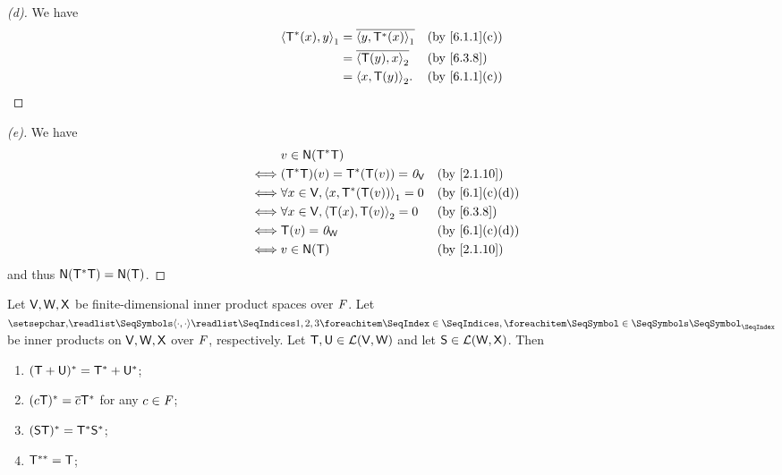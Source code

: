 \begin{proof}[(d)]
  We have
  \begin{align*}
    \inn{\T^*(x), y}_1 & = \conj{\inn{y, \T^*(x)}_1} &  & \text{(by \cref{6.1.1}(c))} \\
                       & = \conj{\inn{\T(y), x}_2}   &  & \text{(by \cref{6.3.8})}    \\
                       & = \inn{x, \T(y)}_2.         &  & \text{(by \cref{6.1.1}(c))}
  \end{align*}
\end{proof}

\begin{proof}[(e)]
  We have
  \begin{align*}
         & v \in \ns{\T^* \T}                                                             \\
    \iff & (\T^* \T)(v) = \T^*(\T(v)) = \zv_{\V}        &  & \text{(by \cref{2.1.10})}    \\
    \iff & \forall x \in \V, \inn{x, \T^*(\T(v))}_1 = 0 &  & \text{(by \cref{6.1}(c)(d))} \\
    \iff & \forall x \in \V, \inn{\T(x), \T(v)}_2 = 0   &  & \text{(by \cref{6.3.8})}     \\
    \iff & \T(v) = \zv_{\W}                             &  & \text{(by \cref{6.1}(c)(d))} \\
    \iff & v \in \ns{\T}                                &  & \text{(by \cref{2.1.10})}
  \end{align*}
  and thus \(\ns{\T^* \T} = \ns{\T}\).
\end{proof}

\begin{ex}\label{ex:6.3.16}
  Let \(\mathsf{V}, \mathsf{W}, \mathsf{X}\) be finite-dimensional inner product spaces over \(\mathit{F}\).
  Let \(\seq{\inn{\cdot, \cdot}}{1,2,3}\) be inner products on \(\mathsf{V}, \mathsf{W}, \mathsf{X}\) over \(\mathit{F}\), respectively.
  Let \(\mathsf{T}, \mathsf{U} \in \mathcal{L}(\mathsf{V}, \mathsf{W})\) and let \(\mathsf{S} \in \mathcal{L}(\mathsf{W}, \mathsf{X})\).
  Then
  \begin{enumerate}
    \item \((\mathsf{T} + \mathsf{U})^* = \mathsf{T}^* + \mathsf{U}^*\);
    \item \((c \mathsf{T})^* = \overline{c} \mathsf{T}^*\) for any \(c \in \mathit{F}\);
    \item \((\mathsf{S} \mathsf{T})^* = \mathsf{T}^* \mathsf{S}^*\);
    \item \(\mathsf{T}^{**} = \mathsf{T}\);
  \end{enumerate}
\end{ex}

